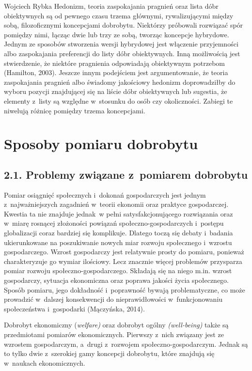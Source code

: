 \begin{artplenv}{Wojciech Rybka}
Hedonizm, teoria zaspokajania pragnień oraz lista dóbr obiektywnych są od pewnego czasu trzema głównymi, rywalizującymi
między sobą, filozoficznymi koncepcjami dobrobytu. Niektórzy próbowali rozwiązać spór pomiędzy nimi, łącząc dwie lub
trzy ze sobą, tworząc koncepcje hybrydowe. Jednym ze sposobów stworzenia wersji hybrydowej jest włączenie przyjemności
albo zaspokajania preferencji do listy dóbr obiektywnych. Inną możliwością jest stwierdzenie, że niektóre pragnienia
odpowiadają obiektywnym potrzebom \label{ref:RNDVSDcVeCgGf}(Hamilton, 2003). Jeszcze innym podejściem jest
argumentowanie, że teoria zaspokajania pragnień albo świadomy jakościowy hedonizm doprowadziłby do wyboru pozycji
znajdującej się na liście dóbr obiektywnych lub sugestia, że elementy z~listy są względne w~stosunku do osób czy
okoliczności. Zabiegi te niwelują różnicę pomiędzy trzema koncepcjami.

\section{Sposoby pomiaru dobrobytu}
\subsection{2.1. Problemy związane z~pomiarem dobrobytu}
Pomiar osiągnięć społecznych i~dokonań gospodarczych jest jednym z~najważniejszych zagadnień w~teorii ekonomii oraz
praktyce gospodarczej. Kwestia ta nie znajduje jednak~w pełni satysfakcjonującego rozwiązania oraz w~miarę rosnącej
złożoności powiązań społeczno-gospodarczych i~postępu globalizacji coraz bardziej się komplikuje. Dlatego toczą się
debaty  i~badania ukierunkowane na poszukiwanie nowych miar rozwoju społecznego i~wzrostu gospodarczego. Wzrost
gospodarczy jest relatywnie prosty do pomiaru, ponieważ charakteryzuje go wymiar ilościowy. Lecz znacznie więcej
problemów przysparza pomiar rozwoju społeczno-gospodarczego. Składają się na niego m.in. wzrost gospodarczy, sytuacja
ekonomiczna oraz poprawa jakości życia społecznego. Sposób pomiaru, jego dokładność i~poprawność bywają problematyczne,
co może prowadzić w~dalszej konsekwencji do nieprawidłowości w~funkcjonowaniu społeczeństwa i~gospodarki
\label{ref:RNDHyuxHBAOij}(Mączyńska, 2014).

Dobrobyt ekonomiczny (\textit{welfare) }oraz dobrobyt ogólny \textit{(well-being) }także są przedmiotami pomiarów
ekonomicznych. Pierwszy z~nich związany jest ze wzrostem gospodarczym, a~drugi z~rozwojem społeczno-gospodarczym.
Jednak są to tylko dwie z~szerokiej gamy koncepcji dobrobytu, które znajdują się w~naukach ekonomicznych.


\end{artplenv}
